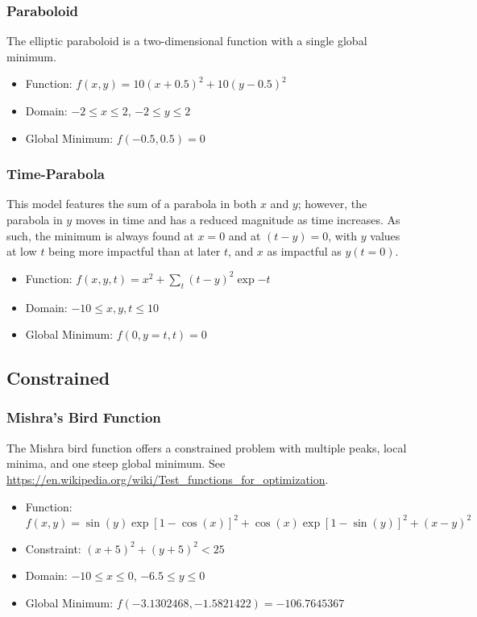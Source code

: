 \subsubsection{Paraboloid}
The elliptic paraboloid is a two-dimensional function with a single global minimum.

\begin{itemize}
  \item Function: $f(x,y) = 10(x+0.5)^2 + 10(y-0.5)^2 $
  \item Domain: $-2 \leq x \leq 2$, $-2 \leq y \leq 2$
  \item Global Minimum: $f(-0.5,0.5) = 0$
\end{itemize}

\subsubsection{Time-Parabola}
This model features the sum of a parabola in both $x$ and $y$; however, the parabola in $y$ moves in time and
has a reduced magnitude as time increases. As such, the minimum is always found at $x=0$ and at $(t-y)=0$, with
$y$ values at low $t$ being more impactful than at later $t$, and $x$ as impactful as $y(t=0)$.

\begin{itemize}
  \item Function: $f(x,y,t) = x^2 + \sum_{t} (t-y)^2 \exp{-t}$
  \item Domain: $-10 \leq x,y,t \leq 10$
  \item Global Minimum: $f(0,y=t,t) = 0$
\end{itemize}



\subsection{Constrained}
\subsubsection{Mishra's Bird Function}
The Mishra bird function offers a constrained problem with multiple peaks, local minima, and one steep global
minimum.
See \url{https://en.wikipedia.org/wiki/Test_functions_for_optimization}.

\begin{itemize}
  \item Function: $f(x,y) = \sin(y)\exp[1-\cos(x)]^2 + \cos(x)\exp[1-\sin(y)]^2 + (x-y)^2$
  \item Constraint: $(x+5)^2 + (y+5)^2 < 25$
  \item Domain: $-10 \leq x \leq 0$, $-6.5 \leq y \leq 0$
  \item Global Minimum: $f(-3.1302468, -1.5821422) = -106.7645367$
\end{itemize}
